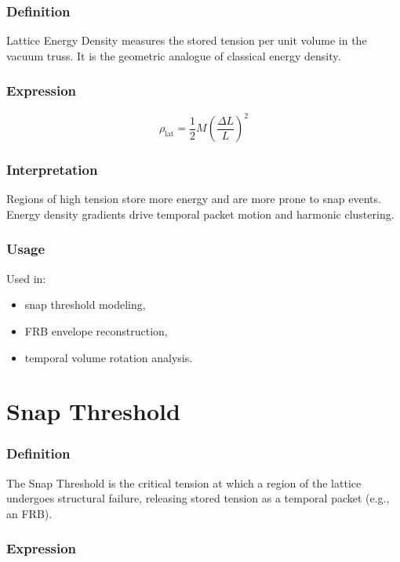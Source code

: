 \documentclass[12pt,oneside]{book}
\begin{document}
\subsubsection{Definition}
Lattice Energy Density measures the stored tension per unit volume in the vacuum truss. It is the
geometric analogue of classical energy density.

\subsubsection{Expression}


\[
\rho_{\mathrm{lat}} = \frac{1}{2} M \left( \frac{\Delta L}{L} \right)^2
\]



\subsubsection{Interpretation}
Regions of high tension store more energy and are more prone to snap events.  
Energy density gradients drive temporal packet motion and harmonic clustering.

\subsubsection{Usage}
Used in:
\begin{itemize}
    \item snap threshold modeling,
    \item FRB envelope reconstruction,
    \item temporal volume rotation analysis.
\end{itemize}


\section{Snap Threshold}

\subsubsection{Definition}
The Snap Threshold is the critical tension at which a region of the lattice undergoes structural
failure, releasing stored tension as a temporal packet (e.g., an FRB).

\subsubsection{Expression}
\end{document}
